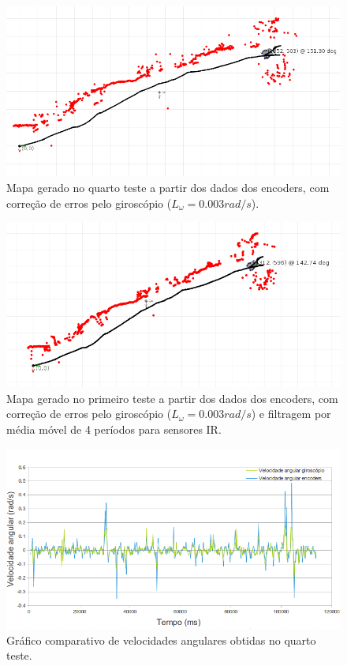 \begin{figure}[H]
	\centering
	\includegraphics[width=1\textwidth]{./figuras/testes/teste4/mapa_encoders_giro.png}
	\caption{Mapa gerado no quarto teste a partir dos dados dos encoders, com correção de erros pelo giroscópio ($L_\omega = 0.003 \unit{rad/s}$).}
	\label{fig:teste4_mapa_encoders_giro}
\end{figure}

\begin{figure}[H]
	\centering
	\includegraphics[width=1\textwidth]{./figuras/testes/teste4/mapa_encoders_giro_media4.png}
	\caption{Mapa gerado no primeiro teste a partir dos dados dos encoders, com correção de erros pelo giroscópio ($L_\omega = 0.003 \unit{rad/s}$) e filtragem por média móvel de 4 períodos para sensores IR.}
	\label{fig:teste4_mapa_encoders_giro_media4}
\end{figure}

\begin{figure}[H]
	\centering
	\includegraphics[width=1\textwidth]{./figuras/testes/teste4/grafico_giro.png}
	\caption{Gráfico comparativo de velocidades angulares obtidas no quarto teste.}
	\label{fig:teste4_giro_grafico}
\end{figure}

